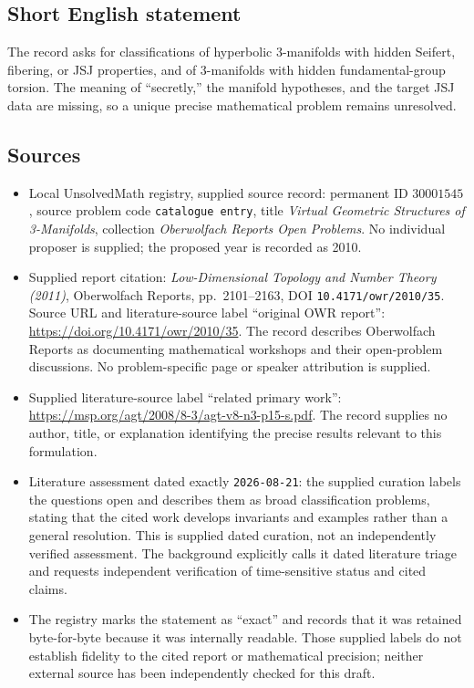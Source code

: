 \documentclass[11pt]{article}
\begin{document}
\subsection{Short English statement}
The record asks for classifications of hyperbolic \(3\)-manifolds with hidden Seifert, fibering, or JSJ properties, and of \(3\)-manifolds with hidden fundamental-group torsion. The meaning of ``secretly,'' the manifold hypotheses, and the target JSJ data are missing, so a unique precise mathematical problem remains unresolved.
\subsection{Sources}
\begin{itemize}
\item Local UnsolvedMath registry, supplied source record: permanent ID \(30001545\), source problem code \texttt{catalogue entry}, title \emph{Virtual Geometric Structures of 3-Manifolds}, collection \emph{Oberwolfach Reports Open Problems}. No individual proposer is supplied; the proposed year is recorded as 2010.
\item Supplied report citation: \emph{Low-Dimensional Topology and Number Theory (2011)}, Oberwolfach Reports, pp.\ 2101--2163, DOI \texttt{10.4171/owr/2010/35}. Source URL and literature-source label ``original OWR report'': \url{https://doi.org/10.4171/owr/2010/35}. The record describes Oberwolfach Reports as documenting mathematical workshops and their open-problem discussions. No problem-specific page or speaker attribution is supplied.
\item Supplied literature-source label ``related primary work'': \url{https://msp.org/agt/2008/8-3/agt-v8-n3-p15-s.pdf}. The record supplies no author, title, or explanation identifying the precise results relevant to this formulation.
\item Literature assessment dated exactly \texttt{2026-08-21}: the supplied curation labels the questions open and describes them as broad classification problems, stating that the cited work develops invariants and examples rather than a general resolution. This is supplied dated curation, not an independently verified assessment. The background explicitly calls it dated literature triage and requests independent verification of time-sensitive status and cited claims.
\item The registry marks the statement as ``exact'' and records that it was retained byte-for-byte because it was internally readable. Those supplied labels do not establish fidelity to the cited report or mathematical precision; neither external source has been independently checked for this draft.
\end{itemize}
\end{document}
